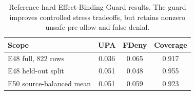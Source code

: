 \begin{table}[t]
\centering
\small
\caption{Reference hard Effect-Binding Guard results. The guard improves controlled stress tradeoffs, but retains nonzero unsafe pre-allow and false denial.}
\label{tab:reference-guard}
\begin{tabular}{lccc}
\toprule
Scope & UPA & FDeny & Coverage \\
\midrule
E48 full, 822 rows & 0.036 & 0.065 & 0.917 \\
E48 held-out split & 0.051 & 0.048 & 0.955 \\
E50 source-balanced mean & 0.051 & 0.059 & 0.923 \\
\bottomrule
\end{tabular}
\end{table}
